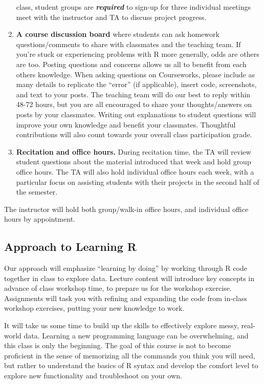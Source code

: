 \documentclass[11pt,]{article}
\begin{document}
\begin{enumerate}
  class, student groups are \emph{\textbf{required}} to sign-up for
  three individual meetings meet with the instructor and TA to discuss
  project progress.
\item
  \textbf{A course discussion board} where students can ask homework
  questions/comments to share with classmates and the teaching team. If
  you're stuck or experiencing problems with R more generally, odds are
  others are too. Posting questions and concerns allows us all to
  benefit from each others knowledge. When asking questions on
  Courseworks, please include as many details to replicate the ``error''
  (if applicable), insert code, screenshots, and text to your posts. The
  teaching team will do our best to reply within 48-72 hours, but you
  are all encouraged to share your thoughts/answers on posts by your
  classmates. Writing out explanations to student questions will improve
  your own knowledge and benefit your classmates. Thoughtful
  contributions will also count towards your overall class participation
  grade.
\item
  \textbf{Recitation and office hours.} During recitation time, the TA
  will review student questions about the material introduced that week
  and hold group office hours. The TA will also hold individual office
  hours each week, with a particular focus on assisting students with
  their projects in the second half of the semester.
\end{enumerate}

The instructor will hold both group/walk-in office hours, and individual
office hours by appointment.

\hypertarget{approach-to-learning-r}{%
\subsection{Approach to Learning R}\label{approach-to-learning-r}}

Our approach will emphasize ``learning by doing'' by working through R
code together in class to explore data. Lecture content will introduce
key concepts in advance of class workshop time, to prepare us for the
workshop exercise. Assignments will task you with refining and expanding
the code from in-class workshop exercises, putting your new knowledge to
work.

It will take us some time to build up the skills to effectively explore
messy, real-world data. Learning a new programming language can be
overwhelming, and this class is only the beginning. The goal of this
course is not to become proficient in the sense of memorizing all the
commands you think you will need, but rather to understand the basics of
R syntax and develop the comfort level to explore new functionality and
troubleshoot on your own.
\end{document}
